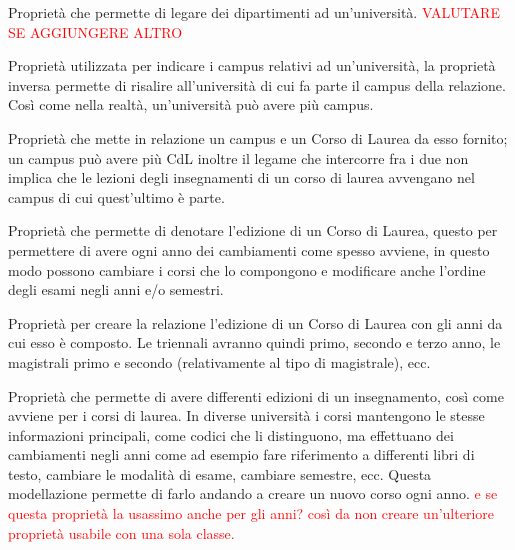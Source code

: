 \begin{itemize}
    
    {Proprietà che permette di legare dei dipartimenti ad un'università. \textcolor{red}{VALUTARE SE AGGIUNGERE ALTRO}}
  
    {Proprietà utilizzata per indicare i campus relativi ad un'università, la proprietà inversa permette di risalire all'università di cui fa parte il campus della relazione.
    \\
    Così come nella realtà, un'università può avere più campus.}

    {Proprietà che mette in relazione un campus e un Corso di Laurea da esso fornito; un campus può avere più CdL inoltre il legame che intercorre fra i due non implica che le lezioni degli insegnamenti di un corso di laurea avvengano nel campus di cui quest'ultimo è parte.}

    {Proprietà che permette di denotare l'edizione di un Corso di Laurea, questo per permettere di avere ogni anno dei cambiamenti come spesso avviene, in questo modo possono cambiare i corsi che lo compongono e modificare anche l'ordine degli esami negli anni e/o semestri.}

    {Proprietà per creare la relazione l'edizione di un Corso di Laurea con gli anni da cui esso è composto. Le triennali avranno quindi primo, secondo e terzo anno, le magistrali primo e secondo (relativamente al tipo di magistrale), ecc.}
    
    {Proprietà che permette di avere differenti edizioni di un insegnamento, così come avviene per i corsi di laurea. In diverse università i corsi mantengono le stesse informazioni principali, come codici che li distinguono, ma effettuano dei cambiamenti negli anni come ad esempio fare riferimento a differenti libri di testo, cambiare le modalità di esame, cambiare semestre, ecc. Questa modellazione permette di farlo andando a creare un nuovo corso ogni anno.
    \textcolor{red}{e se questa proprietà la usassimo anche per gli anni? così da non creare un'ulteriore proprietà usabile con una sola classe.}}


\end{itemize}
